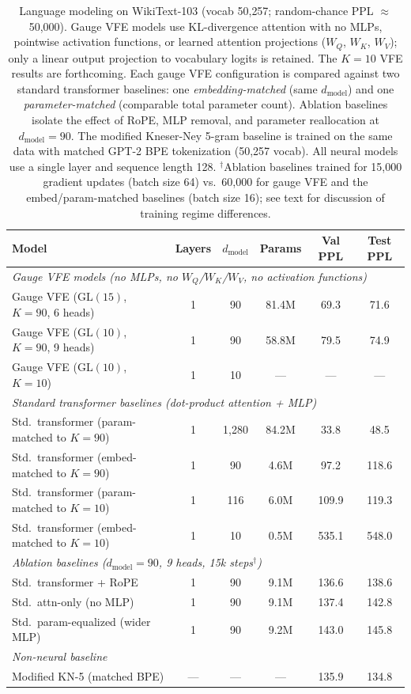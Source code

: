 \documentclass[twoside,11pt]{article}
\begin{document}
\begin{table}[h]
\centering
\begin{tabular}{lccccc}
\hline
\textbf{Model} & \textbf{Layers} & $d_{\text{model}}$ & \textbf{Params} & \textbf{Val PPL} & \textbf{Test PPL} \\
\hline
\multicolumn{6}{l}{\textit{Gauge VFE models (no MLPs, no $W_Q$/$W_K$/$W_V$, no activation functions)}} \\
Gauge VFE ($\mathrm{GL}(15)$, $K\!=\!90$, 6 heads) & 1 & 90 & 81.4M & 69.3 & 71.6 \\
Gauge VFE ($\mathrm{GL}(10)$, $K\!=\!90$, 9 heads) & 1 & 90 & 58.8M & 79.5 & 74.9 \\
Gauge VFE ($\mathrm{GL}(10)$, $K\!=\!10$) & 1 & 10 & ---   & ---  & ---  \\
\hline
\multicolumn{6}{l}{\textit{Standard transformer baselines (dot-product attention + MLP)}} \\
Std.\ transformer (param-matched to $K\!=\!90$) & 1 & 1{,}280 & 84.2M & 33.8 & 48.5 \\
Std.\ transformer (embed-matched to $K\!=\!90$) & 1 & 90    & 4.6M  & 97.2 & 118.6 \\
Std.\ transformer (param-matched to $K\!=\!10$) & 1 & 116   & 6.0M  & 109.9 & 119.3 \\
Std.\ transformer (embed-matched to $K\!=\!10$) & 1 & 10    & 0.5M  & 535.1 & 548.0 \\
\hline
\multicolumn{6}{l}{\textit{Ablation baselines ($d_{\text{model}}\!=\!90$, 9 heads, 15k steps$^\dagger$)}} \\
Std.\ transformer + RoPE           & 1 & 90 & 9.1M & 136.6 & 138.6 \\
Std.\ attn-only (no MLP)           & 1 & 90 & 9.1M & 137.4 & 142.8 \\
Std.\ param-equalized (wider MLP)  & 1 & 90 & 9.2M & 143.0 & 145.8 \\
\hline
\multicolumn{6}{l}{\textit{Non-neural baseline}} \\
Modified KN-5 (matched BPE) & --- & --- & --- & 135.9 & 134.8 \\
\hline
\end{tabular}
\caption{Language modeling on WikiText-103 (vocab 50{,}257; random-chance PPL $\approx$ 50{,}000). Gauge VFE models use KL-divergence attention with no MLPs, pointwise activation functions, or learned attention projections ($W_Q$, $W_K$, $W_V$); only a linear output projection to vocabulary logits is retained. The $K\!=\!10$ VFE results are forthcoming. Each gauge VFE configuration is compared against two standard transformer baselines: one \emph{embedding-matched} (same $d_{\text{model}}$) and one \emph{parameter-matched} (comparable total parameter count). Ablation baselines isolate the effect of RoPE, MLP removal, and parameter reallocation at $d_{\text{model}} = 90$. The modified Kneser-Ney 5-gram baseline \citep{chen1998empirical} is trained on the same data with matched GPT-2 BPE tokenization (50{,}257 vocab). All neural models use a single layer and sequence length 128. $^\dagger$Ablation baselines trained for 15{,}000 gradient updates (batch size 64) vs.\ 60{,}000 for gauge VFE and the embed/param-matched baselines (batch size 16); see text for discussion of training regime differences.}

\end{table}
\end{document}
